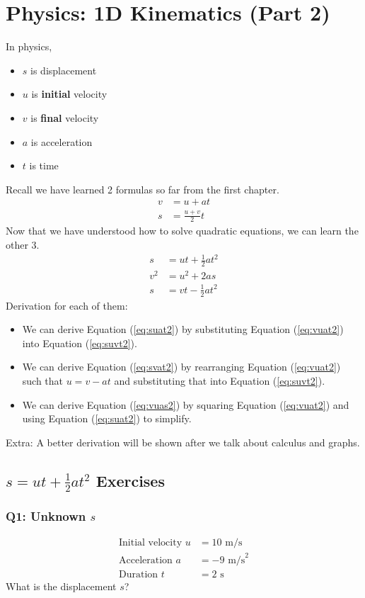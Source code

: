 \documentclass{article}
\begin{document}
\section{Physics: 1D Kinematics (Part 2)}
In physics, 
\begin{itemize}
    \item $s$ is displacement 
    \item $u$ is \textbf{initial} velocity 
    \item $v$ is \textbf{final} velocity
    \item $a$ is acceleration
    \item $t$ is time
\end{itemize}
Recall we have learned 2 formulas so far from the first chapter. 
\begin{align}
    v &= u + at \label{eq:vuat2} \\
    s &= \frac{u+v}{2} t \label{eq:suvt2}
\end{align}
Now that we have understood how to solve quadratic equations, we can learn the other 3.
\begin{align}
s & =u t+\frac{1}{2} a t^2 \label{eq:suat2} \\
v^2 & =u^2+2 a s \label{eq:vuas2} \\
s & =v t-\frac{1}{2} a t^2 \label{eq:svat2}
\end{align}
Derivation for each of them:
\begin{itemize}
    \item We can derive Equation (\ref{eq:suat2}) by substituting Equation (\ref{eq:vuat2}) into Equation (\ref{eq:suvt2}). 
    \item We can derive Equation (\ref{eq:svat2}) by rearranging Equation (\ref{eq:vuat2}) such that $u=v-at$ and substituting that into Equation (\ref{eq:suvt2}). 
    \item We can derive Equation (\ref{eq:vuas2}) by squaring Equation (\ref{eq:vuat2}) and using Equation (\ref{eq:suat2}) to simplify.
\end{itemize}
\noindent Extra: A better derivation will be shown after we talk about calculus and graphs.
\clearpage
\subsection{$s=ut + \frac{1}{2} at^2$ Exercises}
\subsubsection{Q1: Unknown $s$}
\begin{align}
\text{Initial velocity } u&=10 \text{ m/s}\\
\text{Acceleration }a&=-9 \text{ m/s}^2\\
\text{Duration }t&=2 \text{ s}
\end{align}
What is the displacement $s$?
\end{document}

